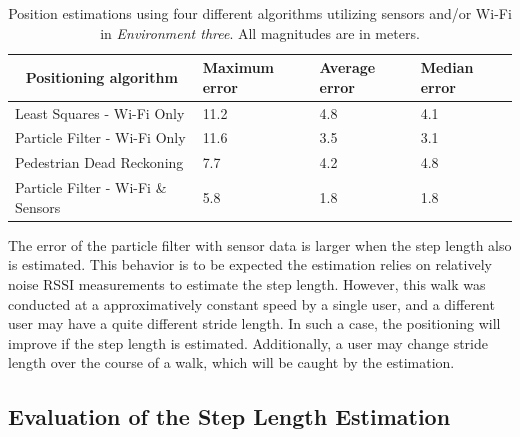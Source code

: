 \documentclass{LTHthesis}
\begin{document}
\begin{table}[!hbt]
\begin{center}
\begin{tabular}{|l|l|l|l|}
\hline
\multicolumn{1}{|c|}{Positioning algorithm} & Maximum error  & Average error  & Median error \\
\hline
\hline
Least Squares - Wi-Fi Only & 11.2 & 4.8 & 4.1 \\
\hline
Particle Filter - Wi-Fi Only & 11.6 & 3.5 & 3.1  \\
\hline
Pedestrian Dead Reckoning & 7.7 & 4.2 & 4.8  \\
\hline
Particle Filter - Wi-Fi \& Sensors & 5.8 & 1.8 & 1.8 \\
\hline
\end{tabular}
\end{center}
\caption{Position estimations using four different algorithms utilizing sensors and/or \newline Wi-Fi in \emph{Environment three}. All magnitudes are in meters.}\label{table:error_different_algorithms}
\end{table}

The error of the particle filter with sensor data is larger when the step length also is estimated. This behavior is to be expected the estimation relies on relatively noise RSSI measurements to estimate the step length. However, this walk was conducted at a approximatively constant speed by a single user, and a different user may have a quite different stride length. In such a case, the positioning will improve if the  step length is estimated. Additionally, a user may change stride length over the course of a walk, which will be caught by the estimation.  
%

\subsection{Evaluation of the Step Length Estimation}
\end{document}
